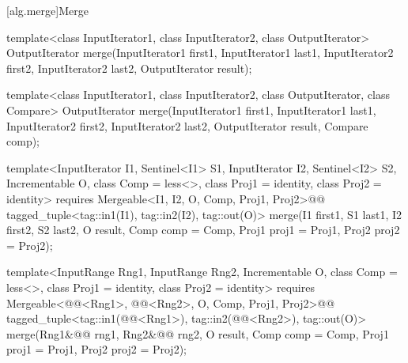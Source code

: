 [alg.merge]{Merge}

%
\begin{removedblock}
\begin{itemdecl}
template<class InputIterator1, class InputIterator2,
         class OutputIterator>
  OutputIterator
    merge(InputIterator1 first1, InputIterator1 last1,
          InputIterator2 first2, InputIterator2 last2,
          OutputIterator result);

template<class InputIterator1, class InputIterator2,
         class OutputIterator, class Compare>
  OutputIterator
    merge(InputIterator1 first1, InputIterator1 last1,
          InputIterator2 first2, InputIterator2 last2,
          OutputIterator result, Compare comp);
\end{itemdecl}
\end{removedblock}
\begin{addedblock}
\begin{itemdecl}
template<InputIterator I1, Sentinel<I1> S1, InputIterator I2, Sentinel<I2> S2,
    Incrementable O, class Comp = less<>, class Proj1 = identity,
    class Proj2 = identity>
  requires Mergeable<I1, I2, O, Comp, Proj1, Proj2>@\newtxt{()}@
  tagged_tuple<tag::in1(I1), tag::in2(I2), tag::out(O)>
    merge(I1 first1, S1 last1, I2 first2, S2 last2, O result,
          Comp comp = Comp{}, Proj1 proj1 = Proj1{}, Proj2 proj2 = Proj2{});

template<InputRange Rng1, InputRange Rng2, Incrementable O, class Comp = less<>,
    class Proj1 = identity, class Proj2 = identity>
  requires Mergeable<@@<Rng1>, @@<Rng2>, O, Comp, Proj1, Proj2>@\newtxt{()}@
  tagged_tuple<tag::in1(@@<Rng1>),
               tag::in2(@@<Rng2>),
               tag::out(O)>
    merge(Rng1&@\newtxt{\&}@ rng1, Rng2&@\newtxt{\&}@ rng2, O result,
          Comp comp = Comp{}, Proj1 proj1 = Proj1{}, Proj2 proj2 = Proj2{});
\end{itemdecl}
\end{addedblock}

